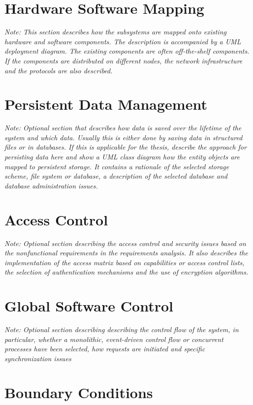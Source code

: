 \documentclass[a4paper,12pt,twoside]{report}
\begin{document}
\section{Hardware Software Mapping}

\textit{Note: This section describes how the subsystems are mapped onto existing hardware and software components. The description is accompanied by a UML deployment diagram. The existing components are often off-the-shelf components. If the components are distributed on different nodes, the network infrastructure and the protocols are also described.}

\section{Persistent Data Management}

\textit{Note: Optional section that describes how data is saved over the lifetime of the system and which data. Usually this is either done by saving data in structured files or in databases. If this is applicable for the thesis, describe the approach for persisting data here and show a UML class diagram how the entity objects are mapped to persistent storage.
It contains a rationale of the selected storage scheme, file system or database, a description of the selected database and database administration issues.}

\section{Access Control}

\textit{Note: Optional section describing the access control and security issues based on the nonfunctional requirements in the requirements analysis. It also describes the implementation of the access matrix based on capabilities or access control lists, the selection of  authentication mechanisms and the use of encryption algorithms.}

\section{Global Software Control}

\textit{Note: Optional section describing describing the control flow of the system, in particular, whether a monolithic, event-driven control flow or concurrent processes have been selected, how requests are initiated and specific synchronization issues}


\section{Boundary Conditions}
\end{document}
